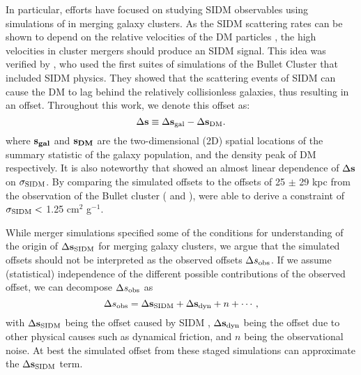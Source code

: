 In particular, efforts have focused on studying SIDM observables 
using simulations of in merging galaxy clusters.
As the SIDM scattering rates can be shown to depend on the 
relative velocities of the DM particles \citep{Markevitch2004}, the high velocities 
in cluster mergers should produce an SIDM signal. This idea was verified by 
\cite{Randall2008d}, who used the first suites of simulations of the
Bullet Cluster that included SIDM physics. 
They showed that the scattering events of SIDM can cause the DM
to lag behind the relatively collisionless galaxies, thus resulting in an offset.
Throughout this work, we denote this offset as:
\begin{equation}
	\Delta {\bf s} \equiv \Delta {\bf s}_{\rm gal} - \Delta {\bf s}_{\rm DM}.
\end{equation}
where $\bf{s}_{gal}$ and $\bf{s}_{DM}$ are the two-dimensional (2D) spatial
locations of the summary statistic of the galaxy population, and the density
peak of DM respectively. 
It is also noteworthy that \cite{Randall2008d} showed an almost linear dependence of
$\Delta {\bf s}$ on $\sigma_{\rm SIDM}$. 
By comparing the simulated offsets to the offsets of 25 $\pm$ 29 kpc from 
the observation of the Bullet cluster
(\citealt{Markevitch2004} and \citealt{Bradac2006b}),
\cite{Randall2008d} were able to derive a constraint of $\sigma_{\rm SIDM} <$ 
1.25 cm$^2$ g$^{-1}$.  

While merger simulations specified some of the conditions 
for understanding of the origin of $\Delta {\bf s}_{{\rm SIDM}}$
for merging galaxy clusters, 
we argue that the simulated offsets should not be interpreted as the observed
offsets $\Delta s_{\rm obs}$.
If we assume (statistical) independence of 
the different possible contributions of the observed 
offset, we can decompose $\Delta s_{\rm obs}$  as
\begin{equation}
	\Delta s_{\rm obs} = \Delta {\bf s}_{{\rm SIDM}} + \Delta {\bf s}_{\rm dyn} + n + \cdots,
	\label{eq:signal_and_noise}
\end{equation}
with $\Delta {\bf s}_{{\rm SIDM}}$ being the offset caused by SIDM , 
$\Delta {\bf s}_{\rm dyn}$ being the offset due to other physical causes such as
dynamical friction, and $n$ being the observational noise.
At best the simulated offset from these staged simulations 
can approximate the $\Delta {\bf s}_{{\rm SIDM}}$ term.


